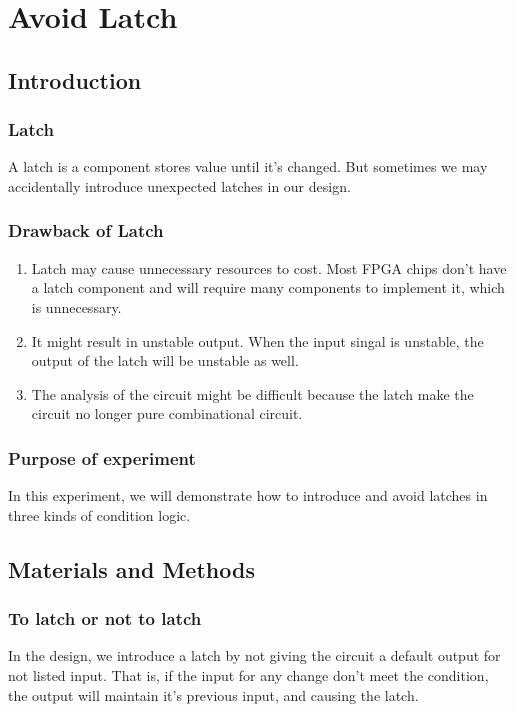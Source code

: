 \section{Avoid Latch}
\subsection{Introduction}%
    \subsubsection{Latch}
    A latch is a component stores value until it's changed. But sometimes we may accidentally introduce unexpected latches in our design.
    \subsubsection{Drawback of Latch}
    \begin{enumerate}
        \item Latch may cause unnecessary resources to cost. Most FPGA chips don't have a latch component and will require many components to implement it, which is unnecessary.
        \item It might result in unstable output. When the input singal is unstable, the output of the latch will be unstable as well.
        \item The analysis of the circuit might be difficult because the latch make the circuit no longer pure combinational circuit.
    \end{enumerate}
    \subsubsection{Purpose of experiment}
    In this experiment, we will demonstrate how to introduce and avoid latches in three
    kinds of condition logic.
\subsection{Materials and Methods}%
    \subsubsection{To latch or not to latch}
        In the design, we introduce a latch by not giving the circuit a default output for not listed input. That is, if the input for any change don't meet the condition, the output will maintain it's previous input, and causing the latch.\par

